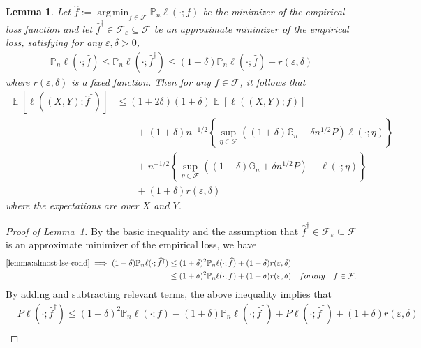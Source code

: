 \documentclass[12pt]{article}
\DeclareMathOperator*{\argmin}{arg\,min}
\DeclareMathOperator*{\E}{\mathbb{E}}
\newtheorem{lemma}[theorem]{Lemma}
\begin{document}
\begin{appendices}
\begin{lemma}\label{lemma:almost-lse}
	Let $\widehat f := \argmin_{f \in \mathcal{F}} \mathbb{P}_n \ell(\cdot; f)$ be the minimizer of the empirical loss function and let $\widehat f^\dag \in \mathcal{F}_\varepsilon \subseteq \mathcal{F}$ be an approximate minimizer of the empirical loss, satisfying for any $\varepsilon, \delta > 0$, 
	\begin{align}\label{lemma:almost-lse-cond}
		 \mathbb{P}_n \ell(\cdot; \widehat f) \le \mathbb{P}_n \ell(\cdot; \widehat f^\dag) \le (1+\delta)\mathbb{P}_n \ell(\cdot; \widehat f) + r(\varepsilon, \delta)
	\end{align}
	where $r(\varepsilon, \delta)$ is a fixed function. Then for any $f \in \mathcal{F}$, it follows that 
		\begin{align*}
	\E[\ell((X, Y); \widehat f^\dag)] &\le (1+2\delta)(1+\delta)\E[\ell((X,Y); f)]\\
	&\qquad+(1+\delta)n^{-1/2}\left\{\sup_{\eta \in \mathcal{F}}\left((1+\delta)\mathbb{G}_n-\delta n^{1/2}P\right)\ell(\cdot; \eta)\right\}\\
    &\qquad + n^{-1/2}\left\{\sup_{\eta \in \mathcal{F}}\left((1+\delta)\mathbb{G}_n+\delta n^{1/2}P\right)-\ell(\cdot; \eta)\right\} \nonumber\\
    &\qquad+ (1+\delta)r(\varepsilon, \delta)
\end{align*}
where the expectations are over $X$ and $Y$. 
\end{lemma}
\begin{proof}[Proof of Lemma~\ref{lemma:almost-lse}]
By the basic inequality and the assumption that $\widehat f^\dag \in \mathcal{F}_\varepsilon \subseteq \mathcal{F}$ is an approximate minimizer of the empirical loss, we have  
	\begin{align}
		\eqref{lemma:almost-lse-cond} \implies (1+\delta)\mathbb{P}_n \ell(\cdot; \widehat f^\dag) &\le  (1+\delta)^2\mathbb{P}_n \ell(\cdot; \widehat f)+ (1+\delta)r(\varepsilon, \delta) \nonumber\\
		&\le (1+\delta)^2\mathbb{P}_n \ell(\cdot; f)  + (1+\delta)r(\varepsilon, \delta)  \quad\textrm{ for any }\quad  f \in \mathcal{F}\nonumber.
	\end{align}
	By adding and subtracting relevant terms, the above inequality implies that 
	\begin{align}
		&P \ell(\cdot; \widehat f^\dag) \le (1+\delta)^2\mathbb{P}_n \ell(\cdot; f) - (1+\delta)\mathbb{P}_n \ell(\cdot; \widehat f^\dag) +P \ell(\cdot; \widehat f^\dag)+ (1+\delta)r(\varepsilon, \delta) \nonumber\\

\end{align}
\end{proof}
\end{appendices}
\end{document}
